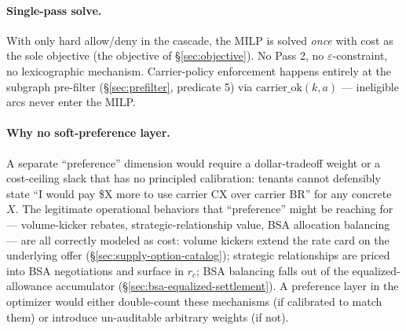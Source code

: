 \documentclass[11pt,a4paper]{article}
\theoremstyle{definition}
\begin{document}
\paragraph{Single-pass solve.}
With only hard allow/deny in the cascade, the MILP is solved \emph{once}
with cost as the sole objective (the objective of \S\ref{sec:objective}).
No Pass 2, no $\varepsilon$-constraint, no lexicographic mechanism.
Carrier-policy enforcement happens entirely at the subgraph pre-filter
(\S\ref{sec:prefilter}, predicate 5) via $\text{carrier\_ok}(k, a)$ ---
ineligible arcs never enter the MILP.

\paragraph{Why no soft-preference layer.}
A separate ``preference'' dimension would require a dollar-tradeoff weight
or a cost-ceiling slack that has no principled calibration: tenants
cannot defensibly state ``I would pay \$X more to use carrier CX over
carrier BR'' for any concrete $X$. The legitimate operational behaviors
that ``preference'' might be reaching for --- volume-kicker rebates,
strategic-relationship value, BSA allocation balancing --- are all
correctly modeled as cost: volume kickers extend the rate card on the
underlying offer (\S\ref{sec:supply-option-catalog}); strategic
relationships are priced into BSA negotiations and surface in $r_c$;
BSA balancing falls out of the equalized-allowance accumulator
(\S\ref{sec:bsa-equalized-settlement}). A preference layer in the
optimizer would either double-count these mechanisms (if calibrated to
match them) or introduce un-auditable arbitrary weights (if not).
\end{document}
